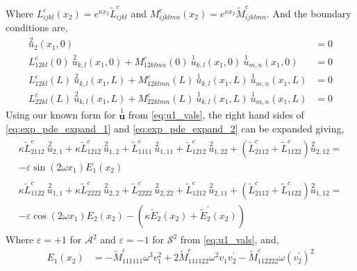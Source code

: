 \documentclass[11pt]{report}
\begin{document}
\begin{appendices}
Where $L^c_{ijkl}(x_2) = e^{\kappa x_2} \tilde{L}^c_{ijkl}$ and $M^c_{ijklmn}(x_2) = e^{\kappa x_2} \tilde{M}^c_{ijklmn}$. And the boundary conditions are,
\begin{equation} \label{eq:exp_bc_raw}
\begin{aligned}
\overset{2}{u}_2(x_1, 0) &= 0 \\
L^c_{12kl} (0) \: \overset{2}{u}_{k,l}(x_1, 0) + M^c_{12klmn}(0) \: \overset{1}{u}_{k,l}(x_1, 0) \: \overset{1}{u}_{m,n}(x_1, 0) &= 0 \\
L^c_{12kl} (L) \: \overset{2}{u}_{k,l}(x_1, L) + M^c_{12klmn}(L) \: \overset{1}{u}_{k,l}(x_1, L) \: \overset{1}{u}_{m,n}(x_1, L) &= 0 \\
L^c_{22kl} (L) \: \overset{2}{u}_{k,l}(x_1, L) + M^c_{22klmn}(L) \: \overset{1}{u}_{k,l}(x_1, L) \: \overset{1}{u}_{m,n}(x_1, L) &= 0
\end{aligned}
\end{equation}
Using our known form for $\overset{1}{\mathbf{u}}$ from \eqref{eq:u1_vals}, the right hand sides of \eqref{eq:exp_pde_expand_1} and \eqref{eq:exp_pde_expand_2} can be expanded giving,
\begin{align}
\begin{split}
\kappa \tilde{L}^{c}_{2112} \: \overset{2}{u}_{2,1} + \kappa \tilde{L}^{c}_{1212} \: \overset{2}{u}_{1,2} + \tilde{L}^{c}_{1111} \: \overset{2}{u}_{1,11} + \tilde{L}^{c}_{1212} \: \overset{2}{u}_{1,22} + (\tilde{L}^{c}_{2112} + \tilde{L}^{c}_{1122}) \overset{2}{u}_{2,12} =  \\
- \varepsilon \sin(2 \omega x_1) E_1(x_2) \label{eq:exp_pde_expand_12}
\end{split}
\\
\begin{split}
\kappa \tilde{L}^{c}_{1122} \: \overset{2}{u}_{1,1} + \kappa \tilde{L}^{c}_{2222} \: \overset{2}{u}_{2,2} + \tilde{L}^{c}_{2222} \: \overset{2}{u}_{2,22}+ \tilde{L}^{c}_{1212} \: \overset{2}{u}_{2,11}+ (\tilde{L}^{c}_{2112} + \tilde{L}^{c}_{1122}) \overset{2}{u}_{1,12} = \\
- \varepsilon \cos(2 \omega x_1) E_2(x_2) - (\kappa \tilde{E}_2 (x_2) + \tilde{E}^{\prime}_2(x_2)) \label{eq:exp_pde_expand_22}
\end{split}
\end{align}
Where $\varepsilon = +1$ for $\mathcal{A}^2$ and $\varepsilon = -1$ for $\mathcal{S}^2$ from \eqref{eq:u1_vals}, and,
\begin{equation}
\begin{aligned}
E_1(x_2) &= -\tilde{M}^c_{111111} \omega^3 v_1^2 + 2 \tilde{M}^c_{111122} \omega^2 v_1 v_2^\prime - \tilde{M}^c_{112222} \omega (v_2^\prime)^2 \\

\end{aligned}
\end{equation}
\end{appendices}
\end{document}
